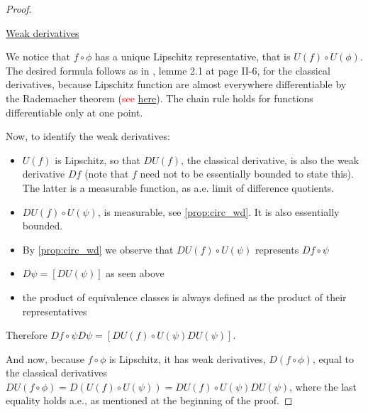 \documentclass[english,a4paper,10pt,oneside]{scrbook}	%
\theoremstyle{break}
\newenvironment{mproof}[1][\proofname]{%
  \begin{proof}[#1]$ $\par\nobreak\ignorespaces
}{%
  \end{proof}
}
\renewcommand*{\proofname}{Proof}
\theoremstyle{remark}
\newcommand{\mR}{\mathbb{R}}
\newcommand{\tred}[1]{\textcolor{red}{#1}}
\begin{document}
\begin{mproof}

\underline{Weak derivatives}

We notice that $f \circ \phi$ has a unique Lipschitz representative, that is $U(f)\circ U(\phi)$. The desired formula follows as in \cite{murat}, lemme 2.1 at page II-6, for the classical derivatives, because Lipschitz function are almost everywhere differentiable by the Rademacher theorem (\tred{see \href{https://abel.math.harvard.edu/archive/212b_spring_05/handouts/Rademacher.pdf}{here}}). The chain rule holds for functions differentiable only at one point. 


Now, to identify the weak derivatives:

\begin{itemize}
	\item $U(f)$ is Lipschitz, so that $DU(f)$, the classical derivative, is also the weak derivative $Df$ (note that $f$ need not to be essentially bounded to state this). The latter is a measurable function, as a.e. limit of difference quotients.
	\item $DU(f)\circ U(\psi)$, is measurable, see \cref{prop:circ_wd}. It is also essentially bounded.
	\item By \cref{prop:circ_wd} we observe that $DU(f)\circ U(\psi)$ represents $Df \circ \psi$
	\item $D\psi = [DU(\psi)]$ as seen above
	\item the product of equivalence classes is always defined as the product of their representatives
\end{itemize}

Therefore $ Df \circ \psi D\psi = [DU(f)\circ U(\psi) DU(\psi)]$.

And now, because $f \circ \phi$ is Lipschitz, it has weak derivatives, $D(f \circ \phi)$, equal to the classical derivatives $DU(f\circ \phi) = D (U(f)\circ U(\psi)) = DU(f)\circ U(\psi) DU(\psi)$, where the last equality holds a.e., as mentioned at the beginning of the proof.


\end{mproof}
\end{document}

